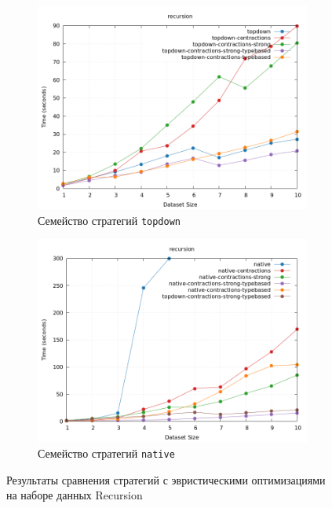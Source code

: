 \documentclass[../diploma.tex]{subfiles}
\begin{document}
\begin{figure}[h]
    \begin{subfigure}{0.5\textwidth}
    \includegraphics[width=\linewidth]{topdown.png} 
    \caption{Семейство стратегий \texttt{topdown}}
    \label{plot_heuristics_topdown}
    \end{subfigure}
    \begin{subfigure}{0.5\textwidth}
    \includegraphics[width=\linewidth]{native.png}
    \caption{Семейство стратегий \texttt{native}}
    \label{plot_heuristics_native}
    \end{subfigure}
    \caption{Результаты сравнения стратегий с эвристическими оптимизациями на наборе данных Recursion}
    \label{plot_heuristics}
\end{figure}
\end{document}

